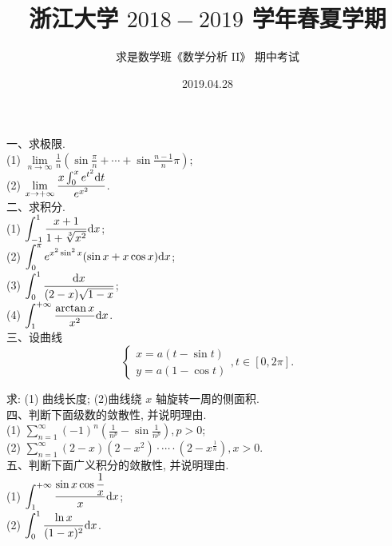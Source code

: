 \documentclass[UTF8]{ctexart}
\title{\LARGE \textbf{浙江大学 $2018-2019$ 学年春夏学期}}
\author{求是数学班《数学分析 II》 期中考试}
\date{2019.04.28}
\begin{document}
\maketitle

一、求极限.
\\

(1) $\displaystyle\lim\limits_{n\rightarrow\infty}\frac{1}{n}\left(\sin\frac{\pi}{n}+\cdots+\sin\frac{n-1}{n}\pi\right)$;
\\

(2) $\displaystyle\lim\limits_{x\rightarrow+\infty}\frac{x\int_{0}^{x}e^{t^2}{\rm d}t}{e^{x^2}}$.
\\

二、求积分.
\\

(1) $\displaystyle\int_{-1}^{1}\frac{x+1}{1+\sqrt[3]{x^2}}{\rm d}x$;
\\

(2) $\displaystyle\int_{0}^{\pi}e^{x^2\sin^2x}(\sin x+x\cos x){\rm d}x$;
\\

(3) $\displaystyle\int_{0}^{1}\frac{{\rm d}x}{(2-x)\sqrt{1-x}}$;
\\

(4) $\displaystyle\int_{1}^{+\infty}\frac{\arctan x}{x^2}{\rm d}x$.
\\

三、设曲线
\[
\begin{cases}
  x=a(t-\sin t)\\
  y=a(1-\cos t)
\end{cases},t\in[0,2\pi].
\]

求: (1) 曲线长度; (2)曲线绕 $x$ 轴旋转一周的侧面积.
\\

四、判断下面级数的敛散性, 并说明理由.
\\

(1) $\displaystyle\sum\limits_{n=1}^{\infty}(-1)^n\left(\frac{1}{n^p}-\sin\frac{1}{n^p}\right), p>0$;
\\

(2) $\displaystyle\sum\limits_{n=1}^{\infty}(2-x)(2-x^2)\cdot\cdots\cdot(2-x^{\frac{1}{n}}), x>0$.
\\

五、判断下面广义积分的敛散性, 并说明理由.
\\

(1) $\displaystyle\int_{1}^{+\infty}\frac{\sin x\cos \displaystyle\frac{1}{x}}{x}{\rm d}x$;
\\

(2) $\displaystyle\int_{0}^{1}\frac{\ln x}{(1-x)^2}{\rm d}x$.
\\
\end{document}
